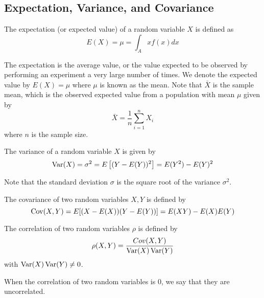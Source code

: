 \subsection{Expectation, Variance, and Covariance}

\begin{definition}
    The expectation (or expected value) of a random variable $X$ is defined as 
    \[E(X) = \mu = \int_A xf(x)dx\]
\end{definition}
The expectation is the average value, or the value expected to be observed by performing an experiment a very large number of times. We denote the expected value by $E(X) = \mu$ where $\mu$ is known as the mean. Note that $\bar{X}$ is the sample mean, which is the observed expected value from a population with mean $\mu$ given by 
\[\bar{X} = \frac{1}{n}\sum_{i=1}^n X_i\]
where $n$ is the sample size.
\begin{definition}[Variance]
    The variance of a random variable $X$ is given by
    \[\operatorname{Var}(X) = \sigma^2 = E\left[(Y - E(Y))^2\right] = E(Y^2) - E(Y)^2\]
\end{definition}
Note that the standard deviation $\sigma$ is the square root of the variance $\sigma^2$.
\begin{definition}[Covariance]
    The covariance of two random variables $X,Y$ is defined by 
    \[\operatorname{Cov}(X,Y) = E[(X-E(X))(Y - E(Y))] = E(XY) - E(X)E(Y)\]
\end{definition}
\begin{definition}[Correlation]
    The correlation of two random variables $\rho$ is defined by 
    \[\rho(X,Y) = \frac{Cov(X,Y)}{\operatorname{Var}(X)\operatorname{Var}(Y)}\]
    with $\operatorname{Var}(X)\operatorname{Var}(Y) \neq 0$.
\end{definition}
When the correlation of two random variables is 0, we say that they are uncorrelated.

